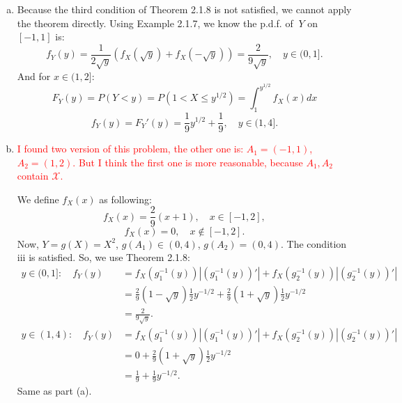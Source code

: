\documentclass[14pt]{elegantbook}
\begin{document}
    \begin{solution}
        \begin{enumerate}[(a)]
            \item Because the third condition of Theorem 2.1.8 is not satisfied, we cannot apply the theorem directly. 
            Using Example 2.1.7, we know the p.d.f. of $\ Y$ on $[-1,1]$ is: 
            \[f_Y(y)=\frac{1}{2\sqrt{y}}(f_X(\sqrt{y})+f_X(-\sqrt{y}))=\frac{2}{9\sqrt{y}},\quad y\in (0, 1]. \]
            And for $x\in (1,2]$: 
            \[F_Y(y)=P(Y<y)=P(1<X\leq y^{1/2})=\int_{1}^{y^{1/2}}f_X(x)dx\]
            \[f_Y(y)=F_Y'(y)=\frac{1}{9}y^{1/2}+\frac{1}{9}, \quad y\in(1,4]. \]
            \item \textcolor{red}{I found two version of this problem, the other one is: $A_1=(-1,1)$, $A_2=(1,2)$. But I think the first one is more reasonable, because $A_1, A_2$ contain $\mathcal{X}$. }
            
            We define $f_X(x)$ as following: 
            \[
                f_X(x)=\frac{2}{9}(x+1), \quad x\in [-1, 2], 
            \]
            \[
                f_X(x)=0, \quad x\notin [-1, 2].
            \]
            Now, $Y=g(X)=X^2$, $g(A_1)\in(0,4)$, $g(A_2)=(0,4)$. The condition iii is satisfied. So, we use Theorem 2.1.8: 
            \begin{align*}
                y\in(0,1]: \quad f_Y(y)&=f_X(g_1^{-1}(y))\left|\left(g_1^{-1}(y)\right)'\right|+f_X(g_2^{-1}(y))\left|\left(g_2^{-1}(y)\right)'\right|\\
                &=\frac{2}{9}(1-\sqrt{y})\frac{1}{2}y^{-1/2}+\frac{2}{9}(1+\sqrt{y})\frac{1}{2}y^{-1/2}\\
                &=\frac{2}{9\sqrt{y}}.\\
                y\in(1,4): \quad f_Y(y)&=f_X(g_1^{-1}(y))\left|\left(g_1^{-1}(y)\right)'\right|+f_X(g_2^{-1}(y))\left|\left(g_2^{-1}(y)\right)'\right|\\
                &=0+\frac{2}{9}(1+\sqrt{y})\frac{1}{2}y^{-1/2}\\
                &=\frac{1}{9}+\frac{1}{9}y^{-1/2}.
            \end{align*}
            Same as part (a). 
        \end{enumerate}
    \end{solution}
\end{document}

